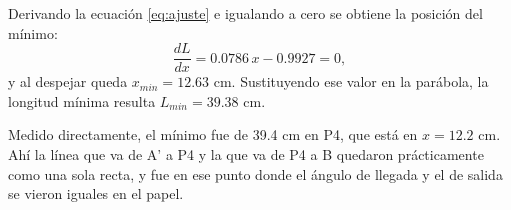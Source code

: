 Derivando la ecuación \eqref{eq:ajuste} e igualando a cero se obtiene la posición del mínimo:
\begin{equation}
\frac{dL}{dx} = 0.0786\,x - 0.9927 = 0 ,
\label{eq:minimo}
\end{equation}
y al despejar queda $x_{min} = 12.63$ cm.
Sustituyendo ese valor en la parábola, la longitud mínima resulta $L_{min} = 39.38$ cm.

Medido directamente, el mínimo fue de 39.4 cm en P4, que está en $x = 12.2$ cm. Ahí la línea que va de A' a P4 y la que va de P4 a B quedaron prácticamente como una sola recta, y fue en ese punto donde el ángulo de llegada y el de salida se vieron iguales en el papel.
